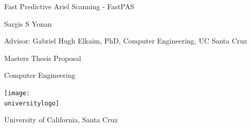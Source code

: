 \documentclass[preprint,12pt]{elsarticle}
\newcommand{\thesisname}{Fast Predictive Ariel Scanning - FastPAS}
\newcommand{\university}{University of California, Santa Cruz}
\newcommand{\universitylogo}{ucsc_logo.png}
\newcommand{\advisor}{Gabriel Hugh Elkaim, PhD, Computer Engineering, UC Santa Cruz}
\newcommand{\name}{Sargis S Yonan}
\begin{document}
\begin{titlepage}
    \centering    
    {\Huge \thesisname \par\vspace{0.5cm}}
    {\Large \name \par\vspace{0.5cm}}
    {Advisor: \advisor \par\vspace{6.75cm}}
	{\Large Masters Thesis Proposal \par\vspace{.25cm}}
    {\Large Computer Engineering \par\vspace{2cm}}
    \texttt{[image: \\universitylogo]} \par\vspace{1cm}
    {\Large \university \par}
    \vspace{1.5cm}

\end{titlepage}

\newpage
\end{document}
